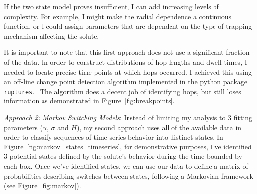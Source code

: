 \documentclass{article}
\begin{document}
  If the two state model proves insufficient, I can add increasing levels of
  complexity. For example, I might make the radial dependence a continuous 
  function, or I could assign parameters that are dependent on the type of
  trapping mechanism affecting the solute.
  
  It is important to note that this first approach does not use a significant
  fraction of the data. In order to construct distributions of hop lengths 
  and dwell times, I needed to locate precise time points at which hops 
  occurred. I achieved this using an off-line change point detection algorithm
  implemented in the python package \texttt{ruptures}.~\cite{truong_review_2018}
  The algorithm does a decent job of identifying hops, but still loses information
  as demonstrated in Figure~\ref{fig:breakpoints}. 

  \textit{Approach 2: Markov Switching Models}: Instead of limiting my 
  analysis to 3 fitting parameters ($\alpha$, $\sigma$ and $H$), my second
  approach uses all of the available data in order to classify sequences
  of time series behavior into distinct states. In 
  Figure~\ref{fig:markov_states_timeseries}, for demonstrative purposes,
  I've identified 3 potential states defined by the solute's behavior 
  during the time bounded by each box. Once we've identified states, we 
  can use our data to define a matrix of probabilities describing switches
  between states, following a Markovian framework (see Figure~\ref{fig:markov}).~\cite{howard_dynamic_1960}
  
\end{document}
